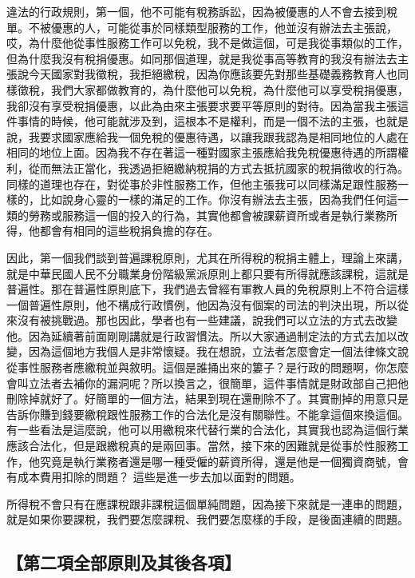 \documentclass[]{ctexbook}
\begin{document}
違法的行政規則，第一個，他不可能有稅務訴訟，因為被優惠的人不會去接到稅單。不被優惠的人，可能從事於同樣類型服務的工作，他並沒有辦法去主張說，哎，為什麼他從事性服務工作可以免稅，我不是做這個，可是我從事類似的工作，但為什麼我沒有稅捐優惠。如同那個道理，就是我從事高等教育的我沒有辦法去主張說今天國家對我徵稅，我拒絕繳稅，因為你應該要先對那些基礎義務教育人也同樣徵稅，我們大家都做教育的，為什麼他可以免稅，為什麼他可以享受稅捐優惠，我卻沒有享受稅捐優惠，以此為由來主張要求要平等原則的對待。因為當我主張這件事情的時候，他可能就涉及到，這根本不是權利，而是一個不法的主張，也就是說，我要求國家應給我一個免稅的優惠待遇，以讓我跟我認為是相同地位的人處在相同的地位上面。因為我不存在著這一種對國家主張應給我免稅優惠待遇的所謂權利，從而無法正當化，我透過拒絕繳納稅捐的方式去抵抗國家的稅捐徵收的行為。同樣的道理也存在，對從事於非性服務工作，但他主張我可以同樣滿足跟性服務一樣的，比如說身心靈的一樣的滿足的工作。你沒有辦法去主張，因為我們任何這一類的勞務或服務這一個的投入的行為，其實他都會被課薪資所或者是執行業務所得，他都會有相同的這些稅捐負擔的存在。

因此，第一個我們談到普遍課稅原則，尤其在所得稅的稅捐主體上，理論上來講，就是中華民國人民不分職業身份階級黨派原則上都只要有所得就應該課稅，這就是普遍性。那在普遍性原則底下，我們過去曾經有軍教人員的免稅原則上不符合這樣一個普遍性原則，他不構成行政慣例，他因為沒有個案的司法的判決出現，所以從來沒有被挑戰過。那也因此，學者也有一些建議，說我們可以立法的方式去改變他。因為延續著前面剛剛講就是行政習慣法。所以大家通過制定法的方式去加以改變，因為這個地方我個人是非常懷疑。我在想說，立法者怎麼會定一個法律條文說從事性服務者應繳稅並與敘明。這個是誰捅出來的簍子？是行政的問題啊，你怎麼會叫立法者去補你的漏洞呢？所以換言之，很簡單，這件事情就是財政部自己把他刪除掉就好了。好簡單的一個方法，結果到現在還刪除不了。其實刪掉的用意只是告訴你賺到錢要繳稅跟性服務工作的合法化是沒有關聯性。不能拿這個來換這個。有一些看法是這麼說，他可以用繳稅來代替行業的合法化，其實我也認為這個行業應該合法化，但是跟繳稅真的是兩回事。當然，接下來的困難就是從事於性服務工作，他究竟是執行業務者還是哪一種受僱的薪資所得，還是他是一個獨資商號，會有成本費用扣除的問題？ 這些是進一步去加以面對的問題。

所得稅不會只有在應課稅跟非課稅這個單純問題，因為接下來就是一連串的問題，就是如果你要課稅，我們要怎麼課稅、我們要怎麼樣的手段，是後面連續的問題。

\hypertarget{ux7b2cux4e8cux9805ux5168ux90e8ux539fux5247ux53caux5176ux5f8cux5404ux9805}{%
\subsection{【第二項全部原則及其後各項】}\label{ux7b2cux4e8cux9805ux5168ux90e8ux539fux5247ux53caux5176ux5f8cux5404ux9805}}
\end{document}
